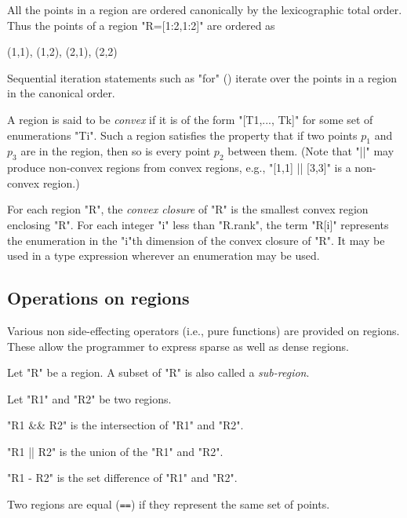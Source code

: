 All the points in a region are ordered canonically by the lexicographic total order. Thus the points of a region \xcd"R=[1:2,1:2]" are ordered as 
\begin{xten}
(1,1), (1,2), (2,1), (2,2)
\end{xten}
Sequential iteration statements such as \xcd"for" ()
iterate over the points in a region in the canonical order.

A region is said to be {\em convex} if it is of
the form \xcd"[T1,..., Tk]" for some set of enumerations \xcd"Ti". Such a
region satisfies the property that if two points $p_1$ and $p_3$ are
in the region, then so is every point $p_2$ between them. (Note that
\xcd"||" may produce non-convex regions from convex regions, e.g.,
\xcd"[1,1] || [3,3]" is a non-convex region.)

For each region \xcd"R", the {\em convex closure} of \xcd"R" is the
smallest convex region enclosing \xcd"R".  For each integer \xcd"i"
less than \xcd"R.rank", the term \xcd"R[i]" represents the enumeration
in the \xcd"i"th dimension of the convex closure of \xcd"R". It may be
used in a type expression wherever an enumeration may be used.

\subsection{Operations on regions}
Various non side-effecting operators (i.e., pure functions) are
provided on regions. These allow the programmer to express sparse as
well as dense regions.

Let \xcd"R" be a region. A subset of \xcd"R" is also called a {\em
sub-region}.

Let \xcd"R1" and \xcd"R2" be two regions.

\xcd"R1 && R2" is the intersection of \xcd"R1" and \xcd"R2".

\xcd"R1 || R2" is the union of the \xcd"R1" and \xcd"R2".

\xcd"R1 - R2" is the set difference of \xcd"R1" and \xcd"R2".

Two regions are equal ({\tt ==}) if they represent the same set of
points.










